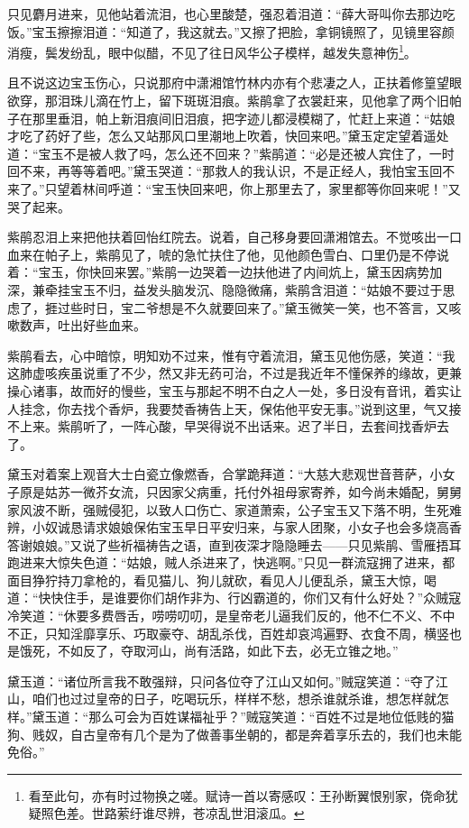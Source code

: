 \documentclass[12pt,oneside]{book}
\begin{document}
只见麝月进来，见他站着流泪，也心里酸楚，强忍着泪道：“薛大哥叫你去那边吃饭。”宝玉擦擦泪道：“知道了，我这就去。”又擦了把脸，拿铜镜照了，见镜里容颜消瘦，鬓发纷乱，眼中似醋，不见了往日风华公子模样，越发失意神伤\footnote{看至此句，亦有时过物换之嗟。赋诗一首以寄感叹：王孙断翼恨别家，侥命犹疑照色差。世路萦纡谁尽辨，苍凉乱世泪滚瓜。}。

且不说这边宝玉伤心，只说那府中潇湘馆竹林内亦有个悲凄之人，正扶着修篁望眼欲穿，那泪珠儿滴在竹上，留下斑斑泪痕。紫鹃拿了衣裳赶来，见他拿了两个旧帕子在那里垂泪，帕上新泪痕间旧泪痕，把字迹儿都浸模糊了，忙赶上来道：“姑娘才吃了药好了些，怎么又站那风口里潮地上吹着，快回来吧。”黛玉定定望着遥处道：“宝玉不是被人救了吗，怎么还不回来？”紫鹃道：“必是还被人宾住了，一时回不来，再等等着吧。”黛玉哭道：“那救人的我认识，不是正经人，我怕宝玉回不来了。”只望着林间呼道：“宝玉快回来吧，你上那里去了，家里都等你回来呢！”又哭了起来。

紫鹃忍泪上来把他扶着回怡红院去。说着，自己移身要回潇湘馆去。不觉咳出一口血来在帕子上，紫鹃见了，唬的急忙扶住了他，见他颜色雪白、口里仍是不停说着：“宝玉，你快回来罢。”紫鹃一边哭着一边扶他进了内间炕上，黛玉因病势加深，兼牵挂宝玉不归，益发头脑发沉、隐隐微痛，紫鹃含泪道：“姑娘不要过于思虑了，捱过些时日，宝二爷想是不久就要回来了。”黛玉微笑一笑，也不答言，又咳嗽数声，吐出好些血来。

紫鹃看去，心中暗惊，明知劝不过来，惟有守着流泪，黛玉见他伤感，笑道：“我这肺虚咳疾虽说重了不少，然又非无药可治，不过是我近年不懂保养的缘故，更兼操心诸事，故而好的慢些，宝玉与那起不明不白之人一处，多日没有音讯，着实让人挂念，你去找个香炉，我要焚香祷告上天，保佑他平安无事。”说到这里，气又接不上来。紫鹃听了，一阵心酸，早哭得说不出话来。迟了半日，去套间找香炉去了。

黛玉对着案上观音大士白瓷立像燃香，合掌跪拜道：“大慈大悲观世音菩萨，小女子原是姑苏一微芥女流，只因家父病重，托付外祖母家寄养，如今尚未婚配，舅舅家风波不断，强贼侵犯，以致人口伤亡、家道萧索，公子宝玉又下落不明，生死难辨，小奴诚恳请求娘娘保佑宝玉早日平安归来，与家人团聚，小女子也会多烧高香答谢娘娘。”又说了些祈福祷告之语，直到夜深才隐隐睡去——只见紫鹃、雪雁捂耳跑进来大惊失色道：“姑娘，贼人杀进来了，快逃啊。”只见一群流寇拥了进来，都面目狰狞持刀拿枪的，看见猫儿、狗儿就砍，看见人儿便乱杀，黛玉大惊，喝道：“快快住手，是谁要你们胡作非为、行凶霸道的，你们又有什么好处？”众贼寇冷笑道：“休要多费唇舌，唠唠叨叨，是皇帝老儿逼我们反的，他不仁不义、不中不正，只知淫靡享乐、巧取豪夺、胡乱杀伐，百姓却哀鸿遍野、衣食不周，横竖也是饿死，不如反了，夺取河山，尚有活路，如此下去，必无立锥之地。”

黛玉道：“诸位所言我不敢强辩，只问各位夺了江山又如何。”贼寇笑道：“夺了江山，咱们也过过皇帝的日子，吃喝玩乐，样样不愁，想杀谁就杀谁，想怎样就怎样。”黛玉道：“那么可会为百姓谋福祉乎？”贼寇笑道：“百姓不过是地位低贱的猫狗、贱奴，自古皇帝有几个是为了做善事坐朝的，都是奔着享乐去的，我们也未能免俗。”
\end{document}
